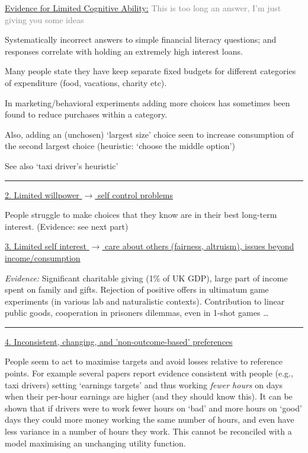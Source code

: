 \documentclass[]{article}
\begin{document}
\underline{Evidence for Limited Cognitive Ability:} \textcolor{gray}{This is too long an answer, I'm just giving you some ideas}

Systematically incorrect answers to simple financial literacy questions; and responses correlate with holding an extremely high interest loans.

Many people state they have keep separate fixed budgets for different categories of expenditure (food, vacations, charity etc).

In marketing/behavioral experiments adding more choices has sometimes been found to reduce purchases within a category.

Also, adding an (unchosen) `largest size' choice seen to increase consumption of the second largest choice (heuristic: `choose the middle option')

See also `taxi driver's heuristic'

\begin{center}\rule{0.5\linewidth}{\linethickness}\end{center}

\underline{2. Limited willpower $\rightarrow$  self control problems}

People struggle to make choices that they know are in their best long-term interest. (Evidence: see next part)

\underline{3. Limited self interest $\rightarrow$  care about others (fairness, altruism), issues beyond income/consumption}

\textit{Evidence:} Significant charitable giving (1\% of UK GDP), large part of income spent on family and gifts. Rejection of positive offers in ultimatum game experiments (in various lab and naturalistic contexts). Contribution to linear public goods, cooperation in prisoners dilemmas, even in 1-shot games \ldots{}

\begin{center}\rule{0.5\linewidth}{\linethickness}\end{center}

\underline{4. Inconsistent, changing, and 'non-outcome-based' preferences}

\small

People seem to act to maximise targets and avoid losses relative to reference points. For example several papers report evidence consistent with people (e.g., taxi drivers) setting `earnings targets' and thus working \textit{fewer hours} on days when their per-hour earnings are higher (and they should know this). It can be shown that if drivers were to work fewer hours on `bad' and more hours on `good' days they could more money working the same number of hours, and even have less variance in a number of hours they work. This cannot be reconciled with a model maximising an unchanging utility function.
\end{document}

